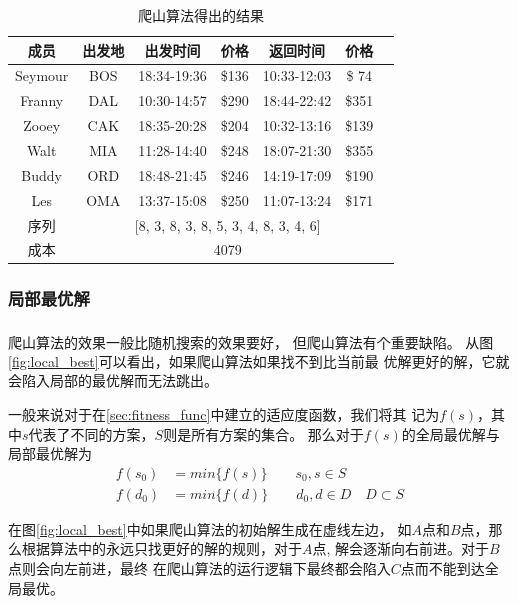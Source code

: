\documentclass[fontset=fandol,a4paper,zihao=5]{ctexart}
\newcommand{\upcite}[1]{\textsuperscript{\textsuperscript{\cite{#1}}}}
\begin{document}
			\begin{table}[!htbp]
			\centering
			\caption{爬山算法得出的结果}
			\label{tab:hillclimb}
			\begin{tabular}{ccccccc}
				\toprule[1pt]
				成员     & 出发地& 出发时间    &  价格  &  返回时间    &   价格 \\
				\midrule
				Seymour   &    BOS & 18:34-19:36 & \$136 & 10:33-12:03 & \$ 74 \\
				Franny    &   DAL & 10:30-14:57 & \$290 & 18:44-22:42 & \$351 \\
				Zooey     &  CAK & 18:35-20:28 & \$204 & 10:32-13:16 & \$139 \\
				Walt      & MIA & 11:28-14:40 & \$248 & 18:07-21:30 & \$355 \\
				Buddy     &  ORD & 18:48-21:45 & \$246 & 14:19-17:09 & \$190 \\
				Les       & OMA & 13:37-15:08 & \$250 & 11:07-13:24 & \$171 \\	
				\midrule
				序列    & \multicolumn{5}{c}{[8, 3, 8, 3, 8, 5, 3, 4, 8, 3, 4, 6]} \\
				成本    & \multicolumn{5}{c}{4079} \\
				\bottomrule[1pt]
			\end{tabular} 
			\end{table}
			

			\subsubsection{局部最优解}
			爬山算法的效果一般比随机搜索的效果要好，
            但爬山算法有个重要缺陷\upcite{Xiao2004A}。
            从图\ref{fig:local_best}可以看出，如果爬山算法如果找不到比当前最
            优解更好的解，它就会陷入局部的最优解而无法跳出。

            一般来说对于在\ref{sec:fitness_func}中建立的适应度函数，我们将其
            记为$f(s)$，其中$s$代表了不同的方案，$S$则是所有方案的集合。
            那么对于$f(s)$的全局最优解与局部最优解为
            \begin{align*}
                f(s_0) &= min\{f(s)\} \qquad s_0,s \in S \\
                f(d_0) &= min\{f(d)\} \qquad d_0,d \in D \quad D \subset S
            \end{align*}

            在图\ref{fig:local_best}中如果爬山算法的初始解生成在虚线左边，
            如$A$点和$B$点，那么根据算法中的永远只找更好的解的规则，对于$A$点,
            解会逐渐向右前进。对于$B$点则会向左前进，最终
            在爬山算法的运行逻辑下最终都会陷入$C$点而不能到达全局最优。
            
\end{document}
